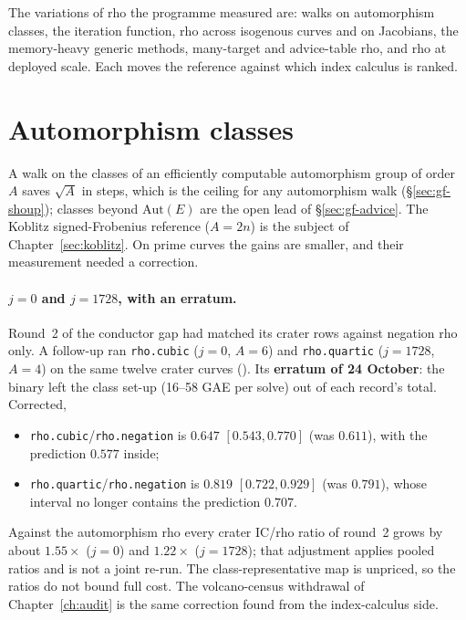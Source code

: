 The variations of rho the programme measured are: walks
on automorphism classes, the iteration function, rho across isogenous
curves and on Jacobians, the memory-heavy generic methods, many-target and
advice-table rho, and rho at deployed scale. Each moves the reference against which index calculus is ranked.

\section{Automorphism classes}\label{sec:rv-aut}

A walk on the classes of an efficiently computable automorphism group of
order $A$ saves $\sqrt A$ in steps, which is the ceiling for any
automorphism walk (\S\ref{sec:gf-shoup}); classes beyond $\mathrm{Aut}(E)$
are the open lead of \S\ref{sec:gf-advice}. The Koblitz signed-Frobenius
reference ($A=2n$) is the subject of Chapter~\ref{sec:koblitz}. On prime
curves the gains are smaller, and their measurement needed a correction.

\paragraph{$j=0$ and $j=1728$, with an erratum.} Round~2 of the conductor
gap had matched its crater rows against negation rho only. A follow-up ran
\texttt{rho.cubic} ($j=0$, $A=6$) and \texttt{rho.quartic} ($j=1728$, $A=4$)
on the same twelve crater curves
(). Its \textbf{erratum of
24 October}: the binary left the class set-up (16--58 GAE per solve) out of
each record's total. Corrected,
\begin{itemize}
\item \texttt{rho.cubic}/\texttt{rho.negation} is $0.647$ $[0.543,0.770]$
  (was $0.611$), with the prediction $0.577$ inside;
\item \texttt{rho.quartic}/\texttt{rho.negation} is $0.819$ $[0.722,0.929]$
  (was $0.791$), whose interval no longer contains the prediction $0.707$.
\end{itemize}
Against the automorphism rho every crater IC/rho ratio of round~2 grows by
about $1.55\times$ ($j=0$) and $1.22\times$ ($j=1728$); that adjustment
applies pooled ratios and is not a joint re-run. The class-representative
map is unpriced, so the ratios do not bound full cost. The volcano-census
withdrawal of Chapter~\ref{ch:audit} is the same correction found from the
index-calculus side.

